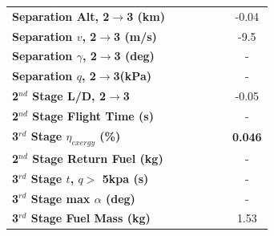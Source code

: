 \begin{table}[ht]
\begin{tabular}{l c c c c c c}
	\\
	\textbf{Separation Alt, 2$\rightarrow$3 (km)}
	& \secondthirdSeparationAltCdNinety
	& \secondthirdSeparationAltCdNinetyFive
	& \secondthirdSeparationAltCdStandard
	& \secondthirdSeparationAltCdOneHundredFive
	& \secondthirdSeparationAltCdOneHundredTen
	&-0.04
	\\
	\textbf{Separation $v$, 2$\rightarrow$3 (m/s)}
	& \secondthirdSeparationvCdNinety
	& \secondthirdSeparationvCdNinetyFive
	& \secondthirdSeparationvCdStandard
	& \secondthirdSeparationvCdOneHundredFive
	& \secondthirdSeparationvCdOneHundredTen
	&-9.5
	\\
	\textbf{Separation $\gamma$, 2$\rightarrow$3 (deg)}
	& \secondthirdSeparationgammaCdNinety
	& \secondthirdSeparationgammaCdNinetyFive
	& \secondthirdSeparationgammaCdStandard
	& \secondthirdSeparationgammaCdOneHundredFive
	& \secondthirdSeparationgammaCdOneHundredTen
	& -
	\\
	\textbf{Separation $q$, 2$\rightarrow$3(kPa)}
	& \secondthirdSeparationqCdNinety
	& \secondthirdSeparationqCdNinetyFive
	& \secondthirdSeparationqCdStandard
	& \secondthirdSeparationqCdOneHundredFive
	& \secondthirdSeparationqCdOneHundredTen
	& -
	\\
	\textbf{2$^{nd}$ Stage L/D, 2$\rightarrow$3}
	& \secondthirdSeparationLDCdNinety
	& \secondthirdSeparationLDCdNinetyFive
	& \secondthirdSeparationLDCdStandard
	& \secondthirdSeparationLDCdOneHundredFive
	& \secondthirdSeparationLDCdOneHundredTen
	&-0.05
	\\
	\textbf{2$^{nd}$ Stage Flight Time (s)}
	& \secondFlightTimeCdNinety
	& \secondFlightTimeCdNinetyFive
	& \secondFlightTimeCdStandard
	& \secondFlightTimeCdOneHundredFive
	& \secondFlightTimeCdOneHundredTen
	& -
	\\
	\hline 
	\textbf{3$^{rd}$ Stage $\eta_{exergy}$ (\%)}
	& \textbf{\thirddExergyEffCdNinety}
	& \textbf{\thirddExergyEffCdNinetyFive}
	& \textbf{\thirddExergyEffCdStandard}
	& \textbf{\thirddExergyEffCdOneHundredFive}
	& \textbf{\thirddExergyEffCdOneHundredTen}
	& \textbf{0.046}
	\\
	\textbf{2$^{nd}$ Stage Return Fuel (kg)}
	& \returnFuelCdNinety
	& \returnFuelCdNinetyFive
	& \returnFuelCdStandard
	& \returnFuelCdOneHundredFive
	& \returnFuelCdOneHundredTen
	& -
	\\
	\textbf{3$^{rd}$ Stage $t$, $q >$ 5kpa (s)}
	& \thirdqOverFiveCdNinety
	& \thirdqOverFiveCdNinetyFive
	& \thirdqOverFiveCdStandard
	& \thirdqOverFiveCdOneHundredFive
	& \thirdqOverFiveCdOneHundredTen
	& -
	\\
	\textbf{3$^{rd}$ Stage max $\alpha$ (deg)}
	& \thirdmaxAoACdNinety
	& \thirdmaxAoACdNinetyFive
	& \thirdmaxAoACdStandard
	& \thirdmaxAoACdOneHundredFive
	& \thirdmaxAoACdOneHundredTen
	& -
	\\
	\textbf{3$^{rd}$ Stage Fuel Mass (kg)}
	& \thirdmFuelCdNinety
	& \thirdmFuelCdNinetyFive
	& \thirdmFuelCdStandard
	& \thirdmFuelCdOneHundredFive
	& \thirdmFuelCdOneHundredTen
	&1.53
	\\
	\hline 
\end{tabular} 
\end{table}


